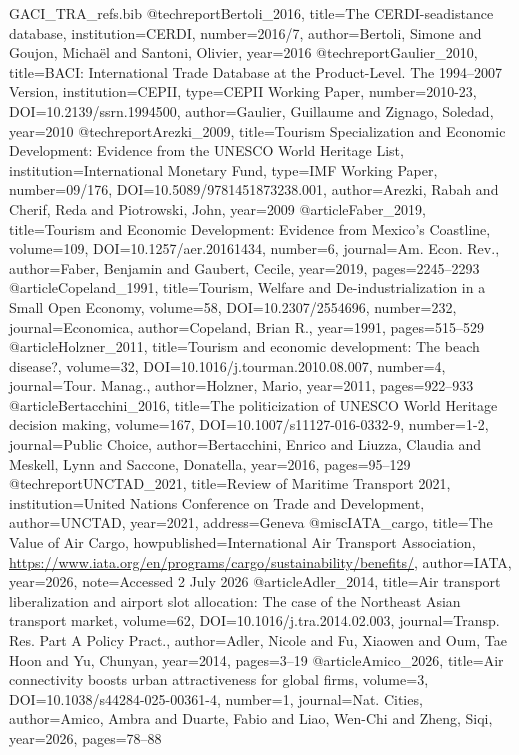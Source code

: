 \begin{filecontents*}[overwrite]{GACI_TRA_refs.bib}
@techreport{Bertoli_2016, title={The {CERDI}-seadistance database}, institution={CERDI}, number={2016/7}, author={Bertoli, Simone and Goujon, Micha\"el and Santoni, Olivier}, year={2016} }
@techreport{Gaulier_2010, title={{BACI}: International Trade Database at the Product-Level. {The} 1994--2007 Version}, institution={CEPII}, type={CEPII Working Paper}, number={2010-23}, DOI={10.2139/ssrn.1994500}, author={Gaulier, Guillaume and Zignago, Soledad}, year={2010} }
@techreport{Arezki_2009, title={Tourism Specialization and Economic Development: Evidence from the {UNESCO} {World Heritage List}}, institution={International Monetary Fund}, type={IMF Working Paper}, number={09/176}, DOI={10.5089/9781451873238.001}, author={Arezki, Rabah and Cherif, Reda and Piotrowski, John}, year={2009} }
@article{Faber_2019, title={Tourism and Economic Development: Evidence from {Mexico}'s Coastline}, volume={109}, DOI={10.1257/aer.20161434}, number={6}, journal={Am. Econ. Rev.}, author={Faber, Benjamin and Gaubert, Cecile}, year={2019}, pages={2245--2293} }
@article{Copeland_1991, title={Tourism, Welfare and De-industrialization in a Small Open Economy}, volume={58}, DOI={10.2307/2554696}, number={232}, journal={Economica}, author={Copeland, Brian R.}, year={1991}, pages={515--529} }
@article{Holzner_2011, title={Tourism and economic development: The beach disease?}, volume={32}, DOI={10.1016/j.tourman.2010.08.007}, number={4}, journal={Tour. Manag.}, author={Holzner, Mario}, year={2011}, pages={922--933} }
@article{Bertacchini_2016, title={The politicization of {UNESCO} {World Heritage} decision making}, volume={167}, DOI={10.1007/s11127-016-0332-9}, number={1-2}, journal={Public Choice}, author={Bertacchini, Enrico and Liuzza, Claudia and Meskell, Lynn and Saccone, Donatella}, year={2016}, pages={95--129} }
@techreport{UNCTAD_2021, title={{Review of Maritime Transport 2021}}, institution={United Nations Conference on Trade and Development}, author={{UNCTAD}}, year={2021}, address={Geneva} }
@misc{IATA_cargo, title={The Value of Air Cargo}, howpublished={International Air Transport Association, \url{https://www.iata.org/en/programs/cargo/sustainability/benefits/}}, author={{IATA}}, year={2026}, note={Accessed 2 July 2026} }
@article{Adler_2014, title={Air transport liberalization and airport slot allocation: The case of the {Northeast Asian} transport market}, volume={62}, DOI={10.1016/j.tra.2014.02.003}, journal={Transp. Res. Part A Policy Pract.}, author={Adler, Nicole and Fu, Xiaowen and Oum, Tae Hoon and Yu, Chunyan}, year={2014}, pages={3--19} }
@article{Amico_2026, title={Air connectivity boosts urban attractiveness for global firms}, volume={3}, DOI={10.1038/s44284-025-00361-4}, number={1}, journal={Nat. Cities}, author={Amico, Ambra and Duarte, Fabio and Liao, Wen-Chi and Zheng, Siqi}, year={2026}, pages={78--88} }

\end{filecontents*}
